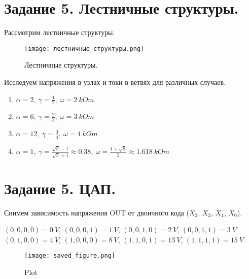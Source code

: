     \section*{Задание 5. Лестничные структуры.}

    \noindent Рассмотрим лестничные структуры.
    \begin{figure}[h!]
        \centering
        \texttt{[image: лестничные\_структуры.png]}
        \caption{Лестничные структуры.}
    \end{figure}

    \noindent Исследуем напряжения в узлах и токи в ветвях для различных случаев.

    \begin{enumerate}
        \item $\alpha = 2,  ~ \gamma = \frac{1}{2}, ~ \omega = 2 ~ kOm$
        \item $\alpha = 6,  ~ \gamma = \frac{2}{3}, ~ \omega = 3 ~ kOm$
        \item $\alpha = 12, ~ \gamma = \frac{3}{4}, ~ \omega = 4 ~ kOm$
        \item $\alpha = 1,  ~ \gamma = \frac{\sqrt{5} - 1}{\sqrt{5} + 1} \approx 0.38, ~ \omega = \frac{1 + \sqrt{5}}{2} \approx 1.618 ~ kOm$
    \end{enumerate}

    \section*{Задание 5. ЦАП.}

    \noindent Снимем зависимость напряжения OUT от двоичного кода ($X_3$, $X_2$, $X_1$, $X_0$).

    \noindent $(0, 0, 0, 0) = 0 ~ V$, $(0, 0, 0, 1) = 1 ~ V$, $(0, 0, 1, 0) = 2 ~ V$, $(0, 0, 1, 1) = 3 ~ V$
    $(0, 1, 0, 0) = 4 ~ V$, $(1, 0, 0, 0) = 8 ~ V$, $(1, 1, 0, 1) = 13 ~ V$,
    $(1, 1, 1, 1) = 15 ~ V$

    \begin{figure}[h!]
        \centering
        \texttt{[image: saved\_figure.png]}
        \caption{Plot}
    \end{figure}


  